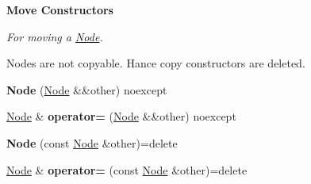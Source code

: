 \begin{Indent}\textbf{ Move Constructors}\par
{\em For moving a \hyperlink{structblaze_1_1Node}{Node}.

Nodes are not copyable. Hance copy constructors are deleted. }\begin{DoxyCompactItemize}
\item 
\mbox{\label{structblaze_1_1Node_aaae7412f72b9c55374a75b6488186725}} 
{\bfseries Node} (\hyperlink{structblaze_1_1Node}{Node} \&\&other) noexcept
\item 
\mbox{\label{structblaze_1_1Node_abb0f200b8c985f10bd4ff2956154ef9b}} 
\hyperlink{structblaze_1_1Node}{Node} \& {\bfseries operator=} (\hyperlink{structblaze_1_1Node}{Node} \&\&other) noexcept
\item 
\mbox{\label{structblaze_1_1Node_ad1a0fafd4be3301fddf0a434a2f2ba12}} 
{\bfseries Node} (const \hyperlink{structblaze_1_1Node}{Node} \&other)=delete
\item 
\mbox{\label{structblaze_1_1Node_a64d32e746903bb69d8c59fa7518974ce}} 
\hyperlink{structblaze_1_1Node}{Node} \& {\bfseries operator=} (const \hyperlink{structblaze_1_1Node}{Node} \&other)=delete
\end{DoxyCompactItemize}
\end{Indent}
